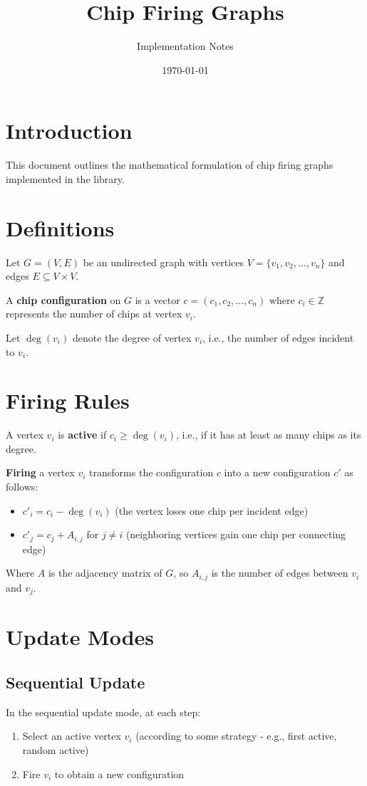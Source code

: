 \documentclass{article}
\title{Chip Firing Graphs}
\author{Implementation Notes}
\date{\today}
\begin{document}
\maketitle

\section{Introduction}
This document outlines the mathematical formulation of chip firing graphs implemented in the library.

\section{Definitions}
Let $G = (V, E)$ be an undirected graph with vertices $V = \{v_1, v_2, \ldots, v_n\}$ and edges $E \subseteq V \times V$.

A \textbf{chip configuration} on $G$ is a vector $c = (c_1, c_2, \ldots, c_n)$ where $c_i \in \mathbb{Z}$ represents the number of chips at vertex $v_i$.

Let $\deg(v_i)$ denote the degree of vertex $v_i$, i.e., the number of edges incident to $v_i$.

\section{Firing Rules}

A vertex $v_i$ is \textbf{active} if $c_i \geq \deg(v_i)$, i.e., if it has at least as many chips as its degree.

\textbf{Firing} a vertex $v_i$ transforms the configuration $c$ into a new configuration $c'$ as follows:
\begin{itemize}
  \item $c'_i = c_i - \deg(v_i)$ (the vertex loses one chip per incident edge)
  \item $c'_j = c_j + A_{i,j}$ for $j \neq i$ (neighboring vertices gain one chip per connecting edge)
\end{itemize}

Where $A$ is the adjacency matrix of $G$, so $A_{i,j}$ is the number of edges between $v_i$ and $v_j$.

\section{Update Modes}

\subsection{Sequential Update}
In the sequential update mode, at each step:
\begin{enumerate}
  \item Select an active vertex $v_i$ (according to some strategy - e.g., first active, random active)
  \item Fire $v_i$ to obtain a new configuration
\end{enumerate}
\end{document}
